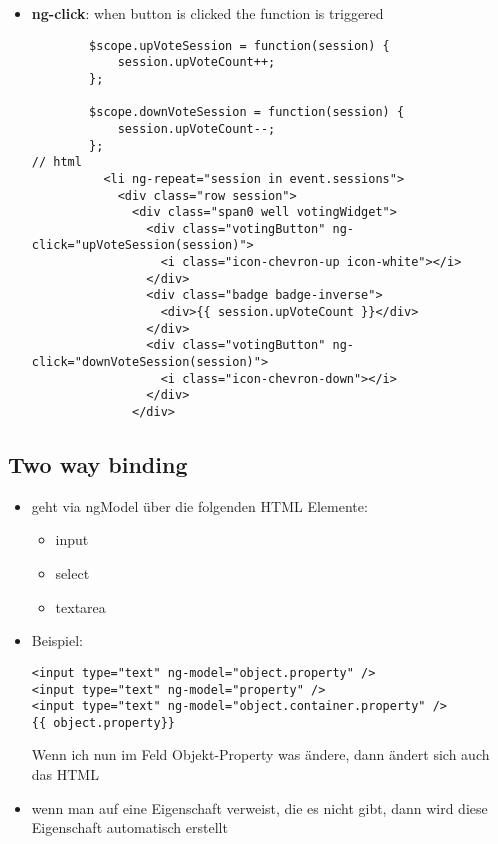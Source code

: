 
\begin{itemize}
  \item \textbf{ng-click}: when button is clicked the function is triggered
    \begin{verbatim}
        $scope.upVoteSession = function(session) {
            session.upVoteCount++;
        };

        $scope.downVoteSession = function(session) {
            session.upVoteCount--;
        };
// html
          <li ng-repeat="session in event.sessions">
            <div class="row session">
              <div class="span0 well votingWidget">
                <div class="votingButton" ng-click="upVoteSession(session)">
                  <i class="icon-chevron-up icon-white"></i>
                </div>
                <div class="badge badge-inverse">
                  <div>{{ session.upVoteCount }}</div>
                </div>
                <div class="votingButton" ng-click="downVoteSession(session)">
                  <i class="icon-chevron-down"></i>
                </div>
              </div>
    \end{verbatim}
\end{itemize}


\subsection{Two way binding}
\begin{itemize}
  \item geht via ngModel über die folgenden HTML Elemente:
    \begin{itemize}
      \item input
      \item select
      \item textarea
    \end{itemize}
  \item Beispiel:
    \begin{verbatim}
<input type="text" ng-model="object.property" />
<input type="text" ng-model="property" />
<input type="text" ng-model="object.container.property" />
{{ object.property}}
    \end{verbatim}

    Wenn ich nun im Feld Objekt-Property was ändere, dann ändert sich auch das HTML
  \item wenn man auf eine Eigenschaft verweist, die es nicht gibt, dann wird diese Eigenschaft
    automatisch erstellt
\end{itemize}


